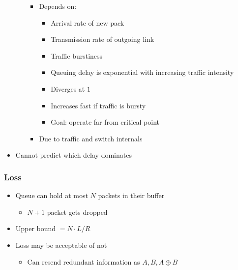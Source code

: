 \begin{itemize}
\begin{itemize}
\begin{itemize}
\begin{itemize}
                        \end{itemize}
                    \item Depends on:
                        \begin{itemize}
                            \item Arrival rate of new pack
                            \item Transmission rate of outgoing link
                            \item Traffic burstiness
                        \end{itemize}
                        \begin{itemize}
                             average packet arrival rate
                             transmission rate on outgoing link
                             fixed packet length
                             average bits arrival rate
                             traffic intensity
                            \item Queuing delay is exponential with increasing traffic intensity
                            \item Diverges at $1$
                            \item Increases fast if traffic is bursty
                            \item Goal: operate far from critical point
                        \end{itemize}
                    \item Due to traffic and switch internals
                \end{itemize}
        \end{itemize}
    \item Cannot predict which delay dominates
\end{itemize}

\subsubsection{Loss}
\begin{itemize}
    \item Queue can hold at most $N$ packets in their buffer
        \begin{itemize}
            \item $N + 1$ packet gets dropped
        \end{itemize}
    \item Upper bound $= N \cdot L / R$
    \item Loss may be acceptable of not
        \begin{itemize}
            \item Can resend redundant information as $A, B, A \oplus B$
        \end{itemize}
\end{itemize}

